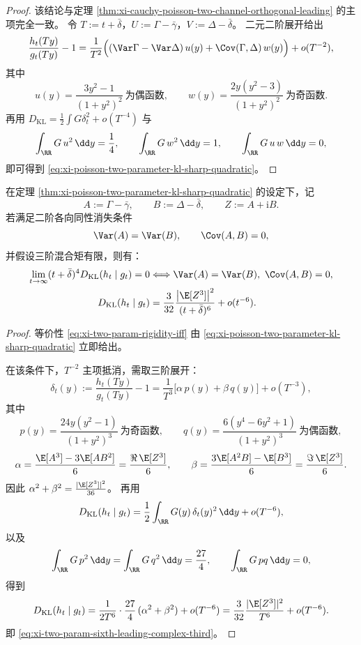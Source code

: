\begin{proof}
该结论与定理 \ref{thm:xi-cauchy-poisson-two-channel-orthogonal-leading} 的主项完全一致。
令 \(T:=t+\bar\delta\)，\(U:=\Gamma-\bar\gamma\)，\(V:=\Delta-\bar\delta\)。
二元二阶展开给出
\[
\frac{h_t(Ty)}{g_t(Ty)}-1
=\frac{1}{T^2}\Bigl((\Var\Gamma-\Var\Delta)\,u(y)+\Cov(\Gamma,\Delta)\,w(y)\Bigr)+o(T^{-2}),
\]
其中
\[
u(y)=\frac{3y^2-1}{(1+y^2)^2}\ \text{为偶函数},\qquad
w(y)=\frac{2y(y^2-3)}{(1+y^2)^2}\ \text{为奇函数}.
\]
再用
\(
D_{\mathrm{KL}}=\frac12\int G\delta_t^2+o(T^{-4})
\)
与
\[
\int_{\RR}G\,u^2\,\dd y=\frac14,\qquad
\int_{\RR}G\,w^2\,\dd y=1,\qquad
\int_{\RR}G\,u\,w\,\dd y=0,
\]
即可得到 \eqref{eq:xi-poisson-two-parameter-kl-sharp-quadratic}。
\end{proof}

\begin{theorem}[双参数超四次衰减的刚性与六阶主项]\label{thm:xi-poisson-two-parameter-sixth-rigidity-complex-third}
在定理 \ref{thm:xi-poisson-two-parameter-kl-sharp-quadratic} 的设定下，记
\[
A:=\Gamma-\bar\gamma,\qquad
B:=\Delta-\bar\delta,\qquad
Z:=A+\mathrm{i}B.
\]
若满足二阶各向同性消失条件
\[
\Var(A)=\Var(B),\qquad \Cov(A,B)=0,
\]
并假设三阶混合矩有限，则有：
\begin{align}
\lim_{t\to\infty}(t+\bar\delta)^4D_{\mathrm{KL}}(h_t\mid g_t)=0
&\Longleftrightarrow
\Var(A)=\Var(B),\ \Cov(A,B)=0,\label{eq:xi-two-param-rigidity-iff}\\
D_{\mathrm{KL}}(h_t\mid g_t)
&=\frac{3}{32}\frac{\left|\E[Z^3]\right|^2}{(t+\bar\delta)^6}
+o(t^{-6}).\label{eq:xi-two-param-sixth-leading-complex-third}
\end{align}
\end{theorem}

\begin{proof}
等价性 \eqref{eq:xi-two-param-rigidity-iff} 由
\eqref{eq:xi-poisson-two-parameter-kl-sharp-quadratic}
立即给出。

在该条件下，\(T^{-2}\) 主项抵消，需取三阶展开：
\[
\delta_t(y):=\frac{h_t(Ty)}{g_t(Ty)}-1
=\frac{1}{T^3}\bigl[\alpha\,p(y)+\beta\,q(y)\bigr]+o(T^{-3}),
\]
其中
\[
p(y)=\frac{24y(y^2-1)}{(1+y^2)^3}\ \text{为奇函数},\qquad
q(y)=\frac{6(y^4-6y^2+1)}{(1+y^2)^3}\ \text{为偶函数},
\]
\[
\alpha=\frac{\E[A^3]-3\E[AB^2]}{6}=\frac{\Re\,\E[Z^3]}{6},\qquad
\beta=\frac{3\E[A^2B]-\E[B^3]}{6}=\frac{\Im\,\E[Z^3]}{6}.
\]
因此 \(\alpha^2+\beta^2=\frac{|\E[Z^3]|^2}{36}\)。
再用
\[
D_{\mathrm{KL}}(h_t\mid g_t)
=\frac12\int_{\RR}G(y)\,\delta_t(y)^2\,\dd y+o(T^{-6}),
\]
以及
\[
\int_{\RR}G\,p^2\,\dd y=\int_{\RR}G\,q^2\,\dd y=\frac{27}{4},\qquad
\int_{\RR}G\,pq\,\dd y=0,
\]
得到
\[
D_{\mathrm{KL}}(h_t\mid g_t)
=\frac{1}{2T^6}\cdot\frac{27}{4}\,(\alpha^2+\beta^2)+o(T^{-6})
=\frac{3}{32}\frac{|\E[Z^3]|^2}{T^6}+o(T^{-6}).
\]
即 \eqref{eq:xi-two-param-sixth-leading-complex-third}。
\end{proof}

